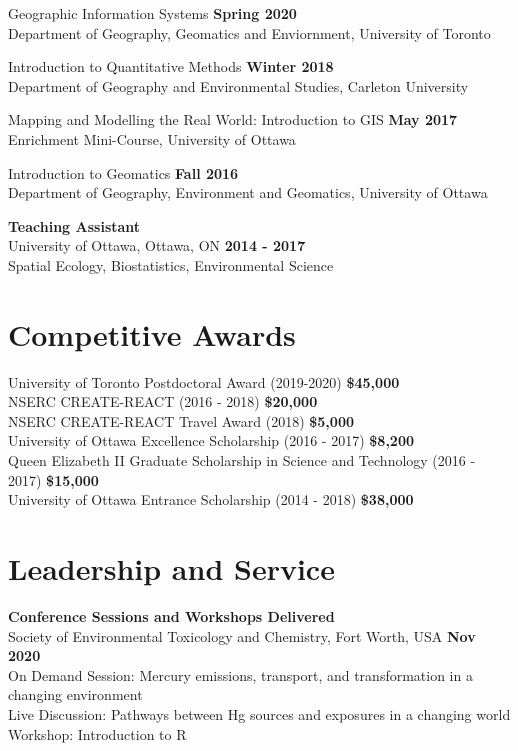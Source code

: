 \documentclass[margin,line]{res}
\begin{document}
\begin{resume}
Geographic Information Systems \hfill {\textbf{Spring 2020}}\\
Department of Geography, Geomatics and Enviornment, University of Toronto

Introduction to Quantitative Methods
 \hfill {\textbf{Winter 2018}}\\
Department of Geography and Environmental Studies, Carleton University

Mapping and Modelling the Real World: Introduction to GIS \hfill {\textbf{May 2017}}\\
Enrichment Mini-Course, University of Ottawa

Introduction to Geomatics
\hfill {\textbf{Fall 2016}}\\
Department of Geography, Environment and Geomatics, University of Ottawa

\textbf{Teaching Assistant }\\
University of Ottawa, Ottawa, ON
\hfill {\textbf{2014 - 2017}}\\
Spatial Ecology, Biostatistics, Environmental Science

\vspace*{.1in}

\section{\sc Competitive Awards}

University of Toronto Postdoctoral Award
(2019-2020)
\hfill {\textbf{\$45,000}}\\
NSERC CREATE-REACT (2016 - 2018)
\hfill {\textbf{\$20,000}}\\
NSERC CREATE-REACT Travel Award (2018)
\hfill {\textbf{\$5,000}}\\
University of Ottawa Excellence Scholarship (2016 - 2017)
\hfill {\textbf{\$8,200}}\\
Queen Elizabeth II Graduate Scholarship in Science and Technology (2016 - 2017)
\hfill {\textbf{\$15,000}}\\
University of Ottawa Entrance Scholarship (2014 - 2018)
\hfill {\textbf{\$38,000}}\\

\vspace*{.1in}

\section{\sc Leadership and Service}
{\bf Conference Sessions and Workshops Delivered}\\
Society of Environmental Toxicology and Chemistry, Fort Worth, USA \hfill {\bf  Nov 2020}\\
On Demand Session: Mercury emissions, transport, and transformation in a changing environment\\
Live Discussion: Pathways between Hg sources and exposures in a changing world\\
Workshop: Introduction to R


\end{resume}
\end{document}
